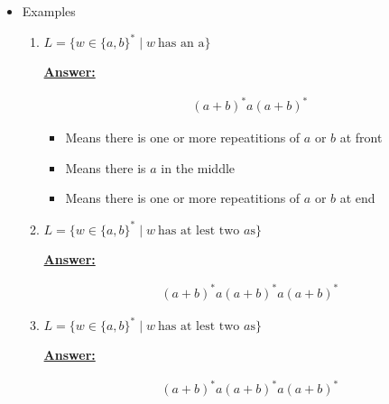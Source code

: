 \documentclass[12pt]{article}
\begin{document}
\begin{enumerate}[a.]
\begin{itemize}
        \item Examples
        \begin{enumerate}[1.]
            \item $L = \{w \in \{a,b\}^* \mid w\:\text{has an a} \}$

            \bigskip

            \begin{mdframed}
                \underline{\textbf{Answer:}}

                \begin{align}
                (a+b)^*a(a+b)^*
                \end{align}

                \bigskip

                \begin{itemize}
                    \item Means there is one or more repeatitions of $a$ or $b$ at front
                    \item Means there is $a$ in the middle
                    \item Means there is one or more repeatitions of $a$ or $b$ at end
                \end{itemize}
            \end{mdframed}

            \item $L = \{w \in \{a,b\}^* \mid w\:\text{has at lest two $a$s}\}$

            \bigskip

            \begin{mdframed}
                \underline{\textbf{Answer:}}

                \begin{align}
                (a+b)^*a(a+b)^*a(a+b)^*
                \end{align}
            \end{mdframed}

            \item $L = \{w \in \{a,b\}^* \mid w\:\text{has at lest two $a$s}\}$

            \bigskip

            \begin{mdframed}
                \underline{\textbf{Answer:}}

                \begin{align}
                (a+b)^*a(a+b)^*a(a+b)^*
                \end{align}
            \end{mdframed}



\end{enumerate}
\end{itemize}
\end{enumerate}
\end{document}
